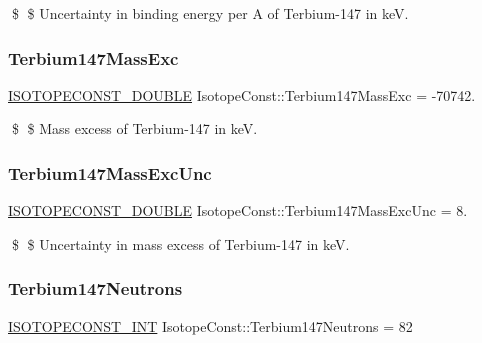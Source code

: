 \$ \$ Uncertainty in binding energy per A of Terbium-\/147 in keV. \mbox{\label{group___isotope_const-_terbium-_tb147_ga9f8d89b23228b14c71d4197efa6d89f1}} 
\subsubsection{\texorpdfstring{Terbium147\+Mass\+Exc}{Terbium147MassExc}}
{\footnotesize\ttfamily \mbox{\hyperlink{group___isotope_const-_macros_ga8f45a7272ce02c0b4c65c44636ed719a}{I\+S\+O\+T\+O\+P\+E\+C\+O\+N\+S\+T\+\_\+\+D\+O\+U\+B\+LE}} Isotope\+Const\+::\+Terbium147\+Mass\+Exc = -\/70742.}

\$ \$ Mass excess of Terbium-\/147 in keV. \mbox{\label{group___isotope_const-_terbium-_tb147_gaed1fa138d45beaec124ede6a3515ee16}} 
\subsubsection{\texorpdfstring{Terbium147\+Mass\+Exc\+Unc}{Terbium147MassExcUnc}}
{\footnotesize\ttfamily \mbox{\hyperlink{group___isotope_const-_macros_ga8f45a7272ce02c0b4c65c44636ed719a}{I\+S\+O\+T\+O\+P\+E\+C\+O\+N\+S\+T\+\_\+\+D\+O\+U\+B\+LE}} Isotope\+Const\+::\+Terbium147\+Mass\+Exc\+Unc = 8.}

\$ \$ Uncertainty in mass excess of Terbium-\/147 in keV. \mbox{\label{group___isotope_const-_terbium-_tb147_gac2981ea2e7a94ff6a74f3082fbf33485}} 
\subsubsection{\texorpdfstring{Terbium147\+Neutrons}{Terbium147Neutrons}}
{\footnotesize\ttfamily \mbox{\hyperlink{group___isotope_const-_macros_ga5f18360b3e99483a35c32d789e62621c}{I\+S\+O\+T\+O\+P\+E\+C\+O\+N\+S\+T\+\_\+\+I\+NT}} Isotope\+Const\+::\+Terbium147\+Neutrons = 82}


